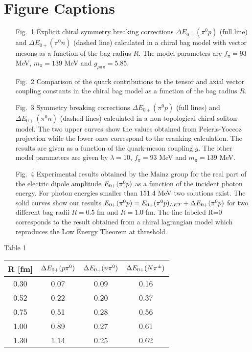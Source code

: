\section*{Figure Captions}
\begin{itemize}
\item[Fig.\ 1]{Explicit chiral symmetry breaking corrections $\Delta
E_{0+}(\pi^0 p)$ (full line) and $\Delta E_{0+} (\pi^0 n)$ (dashed 
line) calculated in a chiral bag model with vector mesons as a function
of the bag radius $R$. The model parameters are $f_{\pi}=93$ MeV,
$m_{\pi}=139$ MeV and $g_{\rho\pi\pi}=5.85$.}
\item[Fig.\ 2]{Comparison of the quark contributions to the tensor 
and axial vector coupling constants in the chiral bag model as a 
function of the bag radius $R$.}
\item[Fig.\ 3]{ Symmetry breaking corrections $\Delta E_{0+}(\pi^0 p)$
(full lines) and $\Delta E_{0+}(\pi^0n)$ (dashed lines) calculated in a
non-topological chiral soliton model. The two upper curves show the
values obtained from Peierls-Yoccoz projection while the lower ones 
correspond to the cranking calculation.
 The results are given as a function
of the quark-meson coupling $g$. The other model parameters are given
by $\lambda=10$, $f_{\pi}=93$ MeV and $m_{\pi}=139$ MeV.}
\item[Fig.\ 4]{Experimental results obtained by the
Mainz \cite{Bec} group for the real part of the electric dipole
amplitude $E_{0+}(\pi^0 p)$ as a function of the incident photon energy.
For photon energies smaller than 151.4 MeV two solutions exist.
 The solid curves show our results 
$E_{0+}(\pi^0 p) =E_{0+}(\pi^0 p)_{LET}+\Delta E_{0+}(\pi^0 p)$ for two different bag radii
$R=0.5$ fm and $R=1.0$ fm. The line labeled R=0 corresponds
 to  the result obtained
from a chiral lagrangian model which reproduces the Low Energy Theorem
at threshold.  }
\end{itemize}   
\newpage
\centerline{\Large Table 1}
\vspace{2cm}
\begin{center}
\begin{tabular}{c||c|c|c}
 R [fm]   & $\Delta E_{0+} (p\pi^0)$  & $\Delta E_{0+} (n\pi^0)$&$\Delta E_{0+} (N\pi^\pm)$\\ \hline\hline
 0.30     & 0.07            &    0.09       &   0.16         \\ \hline
 0.52     &   0.22          &    0.20       &   0.37         \\  \hline
 0.75     &   0.51          &    0.28       &   0.56         \\  \hline
 1.00     &   0.89          &    0.27       &   0.61          \\  \hline
 1.30     &   1.14          &    0.25       &   0.62          \\
\end{tabular}
\end{center}
